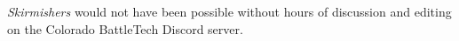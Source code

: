 \emph{Skirmishers} would not have been possible without hours of discussion and editing on the Colorado BattleTech Discord server.

